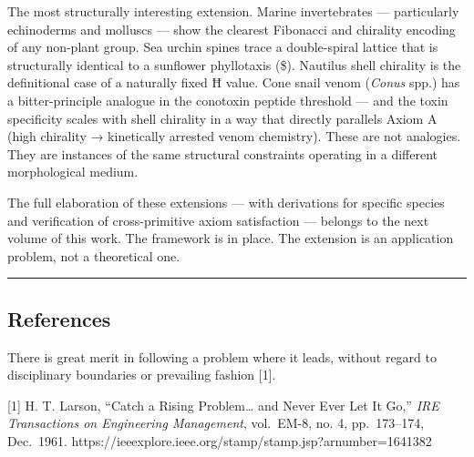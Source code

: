 The most structurally interesting extension. Marine invertebrates ---
particularly echinoderms and molluscs --- show the clearest Fibonacci
and chirality encoding of any non-plant group. Sea urchin spines trace a
double-spiral lattice that is structurally identical to a sunflower
phyllotaxis (\Omega\$). Nautilus shell chirality is the definitional
case of a naturally fixed Ħ value. Cone snail venom (\emph{Conus} spp.)
has a bitter-principle analogue in the conotoxin peptide threshold ---
and the toxin specificity scales with shell chirality in a way that
directly parallels Axiom A (high chirality → kinetically arrested venom
chemistry). These are not analogies. They are instances of the same
structural constraints operating in a different morphological medium.

The full elaboration of these extensions --- with derivations for
specific species and verification of cross-primitive axiom satisfaction
--- belongs to the next volume of this work. The framework is in place.
The extension is an application problem, not a theoretical one.

\begin{center}\rule{0.5\linewidth}{0.5pt}\end{center}

\hypertarget{references}{%
\subsection{References}\label{references}}

There is great merit in following a problem where it leads, without
regard to disciplinary boundaries or prevailing fashion {[}1{]}.

{[}1{]} H. T. Larson, ``Catch a Rising Problem\ldots{} and Never Ever
Let It Go,'' \emph{IRE Transactions on Engineering Management},
vol.~EM-8, no. 4, pp.~173--174, Dec.~1961.
https://ieeexplore.ieee.org/stamp/stamp.jsp?arnumber=1641382
